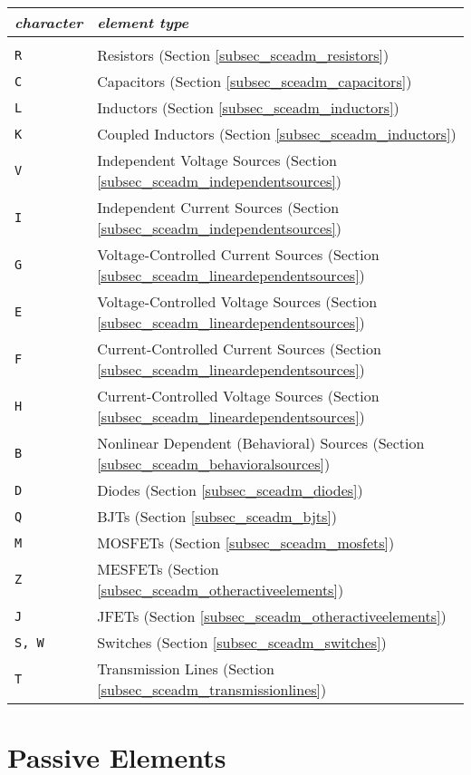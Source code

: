 \begin{tabular}{lp{14cm}}
\textit{character} & \textit{element type}\\ \hline \\ \vspace{-0.8\parskip}
\texttt{R} & Resistors (Section \ref{subsec_sceadm_resistors}) \\
\texttt{C} & Capacitors (Section \ref{subsec_sceadm_capacitors}) \\
\texttt{L} & Inductors (Section \ref{subsec_sceadm_inductors}) \\
\texttt{K} & Coupled Inductors (Section \ref{subsec_sceadm_inductors}) \\
\texttt{V} & Independent Voltage Sources (Section \ref{subsec_sceadm_independentsources}) \\
\texttt{I} & Independent Current Sources (Section \ref{subsec_sceadm_independentsources}) \\
\texttt{G} & Voltage-Controlled Current Sources (Section \ref{subsec_sceadm_lineardependentsources}) \\
\texttt{E} & Voltage-Controlled Voltage Sources (Section \ref{subsec_sceadm_lineardependentsources}) \\
\texttt{F} & Current-Controlled Current Sources (Section \ref{subsec_sceadm_lineardependentsources}) \\
\texttt{H} & Current-Controlled Voltage Sources (Section \ref{subsec_sceadm_lineardependentsources}) \\ 
\texttt{B} & Nonlinear Dependent (Behavioral) Sources (Section \ref{subsec_sceadm_behavioralsources}) \\
\texttt{D} & Diodes (Section \ref{subsec_sceadm_diodes}) \\
\texttt{Q} & BJTs (Section \ref{subsec_sceadm_bjts}) \\
\texttt{M} & MOSFETs (Section \ref{subsec_sceadm_mosfets}) \\
\texttt{Z} & MESFETs (Section \ref{subsec_sceadm_otheractiveelements}) \\
\texttt{J} & JFETs (Section \ref{subsec_sceadm_otheractiveelements}) \\
\texttt{S, W} & Switches (Section \ref{subsec_sceadm_switches}) \\
\texttt{T} & Transmission Lines (Section \ref{subsec_sceadm_transmissionlines}) \\

\end{tabular}

\section{Passive Elements}
\label{sec_sceadm_passiveelements}


